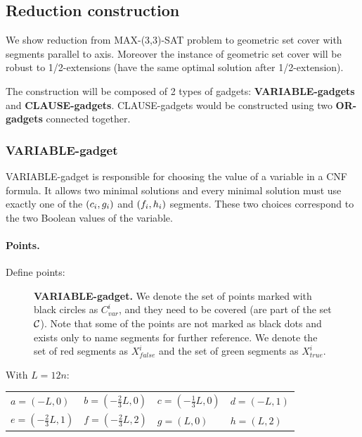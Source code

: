 \subsection{Reduction construction}
We show reduction from MAX-(3,3)-SAT problem
to geometric set cover with segments
parallel to axis. Moreover the instance
of geometric set cover will be robust
to 1/2-extensions (have the same optimal solution
after 1/2-extension).

The construction will be composed of 2 types of gadgets:
\textbf{VARIABLE-gadgets} and \textbf{CLAUSE-gadgets}.
CLAUSE-gadgets would be constructed using two \textbf{OR-gadgets}
connected together.


\subsubsection{VARIABLE-gadget}

VARIABLE-gadget is responsible for choosing the value of a variable
in a CNF formula. It allows two minimal solutions
and every minimal solution must use exactly one of the
$(c_i, g_i)$ and $(f_i, h_i)$
segments. These two choices correspond to the two Boolean values of the variable.

\paragraph{Points.}

Define points:
\begin{figure}[h]
\centering
\def\svgwidth{0.5\columnwidth}

\caption{\textbf{VARIABLE-gadget.}
We denote the set of points marked with black circles as $C_{var}^i$,
and they need to be covered (are part of the set $\mathcal{C}$).
Note that some of the points are not marked as black dots
and exists only to name segments for further reference.
We denote the set of red segments as $X_{false}^i$
and the set of green segments as $X_{true}^i$.}
\label{fig:apx_choose_variable}
\end{figure}

With $L = 12n$:

\begin{center}
\begin{tabular}{ l l l l}
	$a = (-L, 0)$ &
	$b = (-\frac{2}{3}L, 0)$ & 
	$c = (-\frac{1}{3}L, 0)$ & 
	$d = (-L, 1)$ \\  
	$e = (-\frac{2}{3}L, 1)$ & 
	$f = (-\frac{2}{3}L, 2)$ &
	$g = (L, 0)$ &
	$h = (L, 2)$
\end{tabular}
\end{center}

